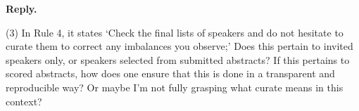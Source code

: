 \documentclass{article}
\newenvironment{Reply}{\noindent\color{BlueViolet}\textbf{Reply.}}{\vspace{1em}}
\begin{document}
\begin{Reply}
\end{Reply}

(3) In Rule 4, it states `Check the final lists of speakers and do not hesitate to curate them to correct any imbalances you observe;' Does this pertain to invited speakers only, or speakers selected from submitted abstracts? If this pertains to scored abstracts, how does one ensure that this is done in a transparent and reproducible way? Or maybe I'm not fully grasping what curate means in this context?
\end{document}
